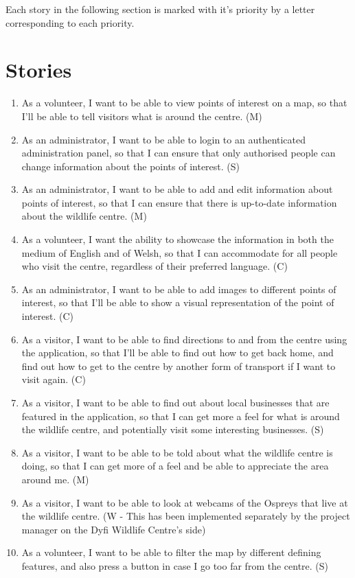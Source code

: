 Each story in the following section is marked with it's priority by a letter corresponding to each priority.

\section{Stories}

\begin{enumerate}
	\item As a volunteer, I want to be able to view points of interest on a map, so that I'll be able to tell visitors what is around the centre. (M)
	\item As an administrator, I want to be able to login to an authenticated administration panel, so that I can ensure that only authorised people can change information about the points of interest. (S)
	\item As an administrator, I want to be able to add and edit information about points of interest, so that I can ensure that there is up-to-date information about the wildlife centre. (M)
	\item As a volunteer, I want the ability to showcase the information in both the medium of English and of Welsh, so that I can accommodate for all people who visit the centre, regardless of their preferred language. (C)
	\item As an administrator, I want to be able to add images to different points of interest, so that I'll be able to show a visual representation of the point of interest. (C)
	\item As a visitor, I want to be able to find directions to and from the centre using the application, so that I'll be able to find out how to get back home, and find out how to get to the centre by another form of transport if I want to visit again. (C)
	\item As a visitor, I want to be able to find out about local businesses that are featured in the application, so that I can get more a feel for what is around the wildlife centre, and potentially visit some interesting businesses. (S)
	\item As a visitor, I want to be able to be told about what the wildlife centre is doing, so that I can get more of a feel and be able to appreciate the area around me. (M)
	\item As a visitor, I want to be able to look at webcams of the Ospreys that live at the wildlife centre. (W - This has been implemented separately by the project manager on the Dyfi Wildlife Centre's side)
	\item As a volunteer, I want to be able to filter the map by different defining features, and also press a button in case I go too far from the centre. (S)
\end{enumerate}

